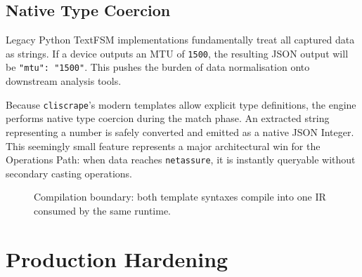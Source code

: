 \documentclass[a4paper,10pt]{article}
\begin{document}
\subsection{Native Type Coercion}

Legacy Python TextFSM implementations fundamentally treat all captured data as strings. If a device outputs an MTU of \texttt{1500}, the resulting JSON output will be \texttt{"mtu": "1500"}. This pushes the burden of data normalisation onto downstream analysis tools. 

Because \texttt{cliscrape}'s modern templates allow explicit type definitions, the engine performs native type coercion during the match phase. An extracted string representing a number is safely converted and emitted as a native \ac{JSON} Integer. This seemingly small feature represents a major architectural win for the Operations Path: when data reaches \texttt{netassure}, it is instantly queryable without secondary casting operations.

\begin{figure}[H]
\centering
{}
\caption{Compilation boundary: both template syntaxes compile into one IR consumed by the same runtime.}
\label{fig:cs-compile}
\end{figure}


\section{Production Hardening}
\label{sec:hardening}
\end{document}
